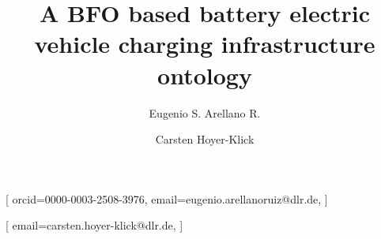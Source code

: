 \documentclass[hf]{ceurart}
\theoremstyle{empty}
\theoremstyle{emptybreak}
\begin{document}
\makeatletter

\newlength\oriarrayrulewidth  
\newcount\orilowpenalty
\newcommand\nobreakmidrule{%
 \noalign{\global\oriarrayrulewidth\arrayrulewidth\relax
          \global\orilowpenalty\@lowpenalty\relax  
          \global\@lowpenalty=\numexpr-10000\relax%
          \global\arrayrulewidth\lightrulewidth\relax}
 \hline
 \noalign{\global\@lowpenalty=\orilowpenalty\relax%
          \global\arrayrulewidth\oriarrayrulewidth\relax}}

\makeatother


\title{A BFO based battery electric vehicle charging infrastructure ontology}

\author[1]{Eugenio S. Arellano R.}[%
orcid=0000-0003-2508-3976,
email=eugenio.arellanoruiz@dlr.de,
]
\author[1]{Carsten Hoyer-Klick}[%
email=carsten.hoyer-klick@dlr.de,
]


\address[1]{German Aerospace Center (DLR), Department of Energy Systems Analysis, Institute of Networked
	Energy Systems, Stuttgart, Germany}







\maketitle















\newpage
\appendix
\end{document}
